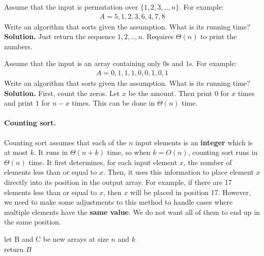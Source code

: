\begin{example} Assume that the input is permutation over $\{1 ,2 ,3, .., n \}$. For example: \begin{equation*}
    \begin{split}
  A = 5,1,2,3,6,4,7,8
    \end{split}
  \end{equation*}
Write an algorithm that sorts given the assumption. What is its running time? \\


\textbf{Solution.}  Just return the sequence $1,2,..,n$. Requires $\Theta(n)$ to print the numbers. 
\end{example}
\begin{example} Assume that the input is an array containing only $0$s and $1$s. For example: \begin{equation*}
    \begin{split}
  A = 0,1,1,1,0,0,1,0,1
    \end{split}
  \end{equation*}
Write an algorithm that sorts given the assumption. What is its running time? \\

\textbf{Solution.} First, count the zeros. Let $x$ be the amount. Then print $0$ for $x$ times and print $1$ for $n-x$ times. This can be done in $\Theta(n)$ time.
\end{example}



\paragraph{Counting sort.}
Counting sort assumes that each of the $n$ input elements is an \textbf{integer} which is at most $k$. It runs in $\Theta(n + k)$ time, so when $k = O(n)$, counting sort runs in $\Theta(n)$ time. It first determines, for each input element $x$, the number of elements less than or equal to $x$. Then, it uses this information to place element $x$ directly into its position in the output array. For example, if there are 17 elements less than or equal to $x$, then $x$ will be placed in position 17. However, we need to make some adjustments to this method to handle cases where multiple elements have the \textbf{same value}. We do not want all of them to end up in the same position.

  \begin{algorithm}
  	let B and C be new arrays at size $n$ and $k$ \\ 
	  return $B$
\caption{Counting-sort$(A, n, k)$}
  \end{algorithm}


